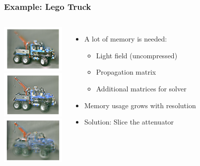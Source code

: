\documentclass[12pt, compress]{beamer}
\begin{document}
\begin{frame}[fragile]
	\frametitle{Example: Lego Truck}
	
	\begin{columns}
			\includegraphics[width = 3.1cm]{images/layers_and_projections/legotruck/3}
			\\
			\includegraphics[width = 3.1cm]{images/layers_and_projections/legotruck/2}
			\\
			\includegraphics[width = 3.1cm]{images/layers_and_projections/legotruck/1}
			\\
			\begin{itemize}
				\item \alert<1>{A lot of memory is needed:}
					\begin{itemize}
						\item Light field (uncompressed)
						\item Propagation matrix %
						\item Additional matrices for solver
					\end{itemize}
				\item \alert<2>{Memory usage grows with resolution}
				\item \alert<3>{Solution: Slice the attenuator}
			\end{itemize}
	\end{columns}
	
\end{frame}
\end{document}
